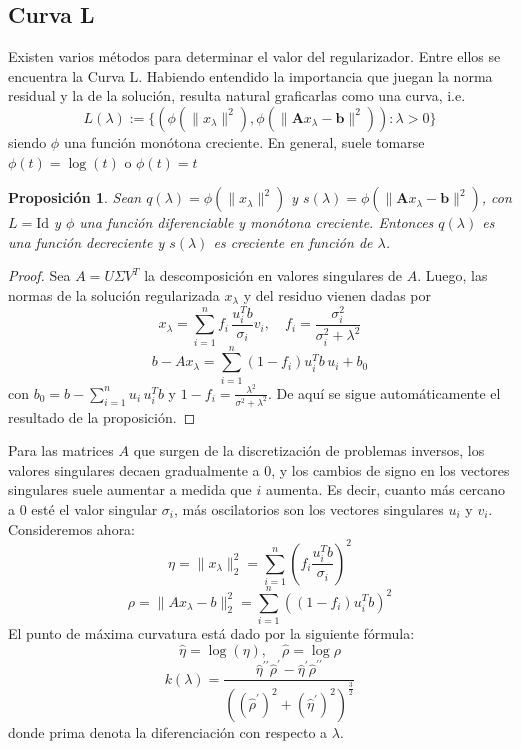 \documentclass[12pt, oneside]{book}
\begin{document}
	\subsection{Curva L}
	Existen varios métodos para determinar el valor del regularizador. Entre ellos se encuentra la Curva L.
	Habiendo entendido la importancia que juegan la norma residual y la de la solución, resulta natural graficarlas como una curva, i.e.
	\[
	L(\lambda) := \{(\phi (\| x_\lambda  \|^2), \phi (\| \mathbf{A}x_\lambda - \mathbf{b} \|^2) ): \lambda > 0\}
	\]
	siendo $\phi$ una función monótona creciente. En general, suele tomarse $\phi(t) = \log(t)$ o $\phi(t) = t$
	\newtheorem{proposition}{Proposición}
	\begin{proposition}
	Sean $q(\lambda) = \phi (\| x_\lambda  \|^2)$ y $s(\lambda) = \phi (\| \mathbf{A}x_\lambda - \mathbf{b} \|^2 )$, con $L = \mathrm{Id}$ y $\phi$ una función diferenciable y monótona creciente. Entonces $q(\lambda)$ es una función decreciente y $s(\lambda)$ es creciente en función de $\lambda$.
	\end{proposition}
	\begin{proof}
	Sea $A = U \Sigma V^T$ la descomposición en valores singulares de $A$. Luego, las normas de la solución regularizada $x_\lambda$ y del residuo vienen dadas por
	\begin{equation}
		x_\lambda = \sum_{i=1}^{n} f_i\, \frac{u_i^T b}{\sigma_i} v_i, \quad f_i = \frac{\sigma_i^2}{ \sigma_i^{2} + \lambda^2}
	\end{equation}
	\begin{equation}
		b - Ax_\lambda = \sum_{i=1}^{n} (1-f_i)u_i^Tb\,u_i + b_0
	\end{equation}	
	con $b_0 = b - \sum_{i=1}^{n} u_i \, u_i^T b$ y $1 - f_i = \frac{\lambda^2}{\sigma^2 + \lambda^2}$. De aquí se sigue automáticamente el resultado de la proposición.	
	\end{proof}
	Para las matrices $A$ que surgen de la discretización de problemas inversos, los valores singulares decaen gradualmente a 0, y los cambios de signo en los vectores singulares suele aumentar a medida que $i$ aumenta. Es decir, cuanto más cercano a 0 esté el valor singular $\sigma_i$, más oscilatorios son los vectores singulares $u_i$ y $v_i$. Consideremos ahora:
	\[
	\eta = \| x_\lambda \|_2^2 = \sum_{i=1}^{n} (f_i\frac{u_i^T b}{\sigma_i})^2
	\]
	\[
	 \rho = \|Ax_\lambda - b\|_2^2 =  \sum_{i=1}^{n} ((1-f_i)u_i^Tb)^2
	\]
	El punto de máxima curvatura está dado por la siguiente fórmula:
	\[
	\hat{\eta} = \log(\eta), \quad \hat{\rho} =\log{\rho}
	\]
	\[
	k(\lambda) =\frac{ \hat{\eta}^{\prime\prime}\hat{\rho}^{\prime} -  \hat{\eta}^{\prime} \hat{\rho}^{\prime\prime}}{((\hat{\rho}^{\prime})^2 + (\hat{\eta}^{\prime})^2)^{\frac{3}{2}}}
	\]
	donde prima denota la diferenciación con respecto a $\lambda$.
	
\end{document}
